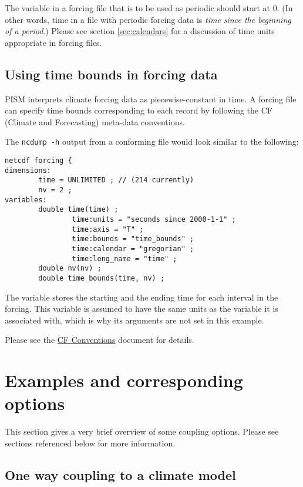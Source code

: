 \documentclass[titlepage,letterpaper,final]{scrartcl}
\begin{document}
The  variable  in a forcing file that is to  be used as periodic
should start at $0$. (In other words, time in a file with periodic forcing data
is  \emph{time  since   the  beginning  of  a  period}.)   Please  see  section
\ref{sec:calendars}  for a  discussion  of time  units  appropriate in  forcing
files.


\subsection{Using time bounds in forcing data}
\label{sec:time-bounds}

PISM interprets climate forcing data as piecewise-constant in time. A forcing file can specify time bounds corresponding to each record by following the CF (Climate and Forecasting) meta-data conventions.

The \texttt{ncdump -h} output from a conforming file would look similar to the
following:
\begin{verbatim}
netcdf forcing {
dimensions:
        time = UNLIMITED ; // (214 currently)
        nv = 2 ;
variables:
        double time(time) ;
                time:units = "seconds since 2000-1-1" ;
                time:axis = "T" ;
                time:bounds = "time_bounds" ;
                time:calendar = "gregorian" ;
                time:long_name = "time" ;
        double nv(nv) ;
        double time_bounds(time, nv) ;
\end{verbatim}

The  variable stores the starting and the ending time for
each interval in the forcing. This variable is assumed to have the same units
as the  variable it is associated with, which is why its arguments
are not set in this example.

Please see the
\href{http://cf-pcmdi.llnl.gov/documents/cf-conventions/1.6/cf-conventions.html#cell-boundaries}{CF
Conventions} document for details.




\clearpage\newpage
\section{Examples and corresponding options}
\label{sec:examples}

This section gives a very brief overview of some coupling options. Please see sections referenced below for more information.

\subsection{One way coupling to a climate model}
\label{sec:one-way-coupling}
\end{document}
